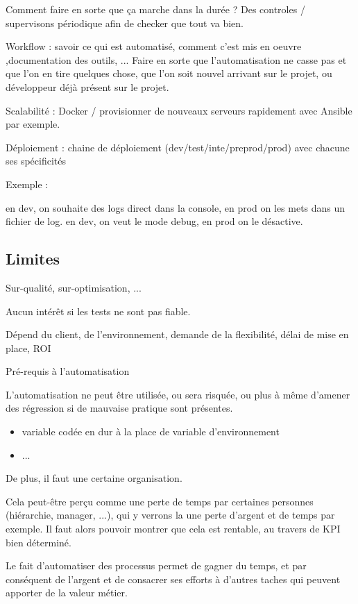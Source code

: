 Comment faire en sorte que ça marche dans la durée ? Des controles / supervisons périodique afin de checker que tout va bien.

Workflow : savoir ce qui est automatisé, comment c'est mis en oeuvre ,documentation des outils, ...
Faire en sorte que l'automatisation ne casse pas et que l'on en tire quelques chose, que l'on soit nouvel arrivant sur le projet, ou développeur déjà présent sur le projet.

Scalabilité : Docker / provisionner de nouveaux serveurs rapidement avec Ansible par exemple.

Déploiement : chaine de déploiement (dev/test/inte/preprod/prod) avec chacune ses spécificités

Exemple :

en dev, on souhaite des logs direct dans la console, en prod on les mets dans un fichier de log.
en dev, on veut le mode debug, en prod on le désactive.

\subsection{Limites}


Sur-qualité, sur-optimisation, ...

Aucun intérêt si les tests ne sont pas fiable.

Dépend du client, de l'environnement, demande de la flexibilité, délai de mise en place, ROI

Pré-requis à l'automatisation

L'automatisation ne peut être utilisée, ou sera risquée, ou plus à même d'amener des régression si de mauvaise pratique sont présentes.

\begin{itemize}
	\item variable codée en dur à la place de variable d'environnement
	\item ...
\end{itemize}

De plus, il faut une certaine organisation.

Cela peut-être perçu comme une perte de temps par certaines personnes (hiérarchie, manager, ...), qui y verrons la une perte d'argent et de temps par exemple. Il faut alors pouvoir montrer que cela est rentable, au travers de \gls{KPI} bien déterminé.

Le fait d'automatiser des processus permet de gagner du temps, et par conséquent de l'argent et de consacrer ses efforts à d'autres taches qui peuvent apporter de la valeur métier.

